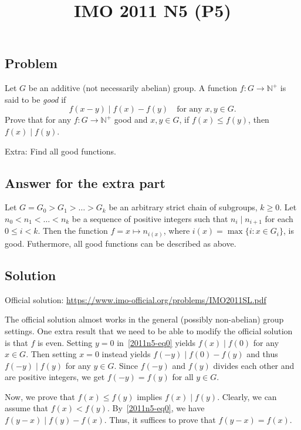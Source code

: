 \documentclass{article}
\title{IMO 2011 N5 (P5)}
\author{}
\date{}
\newcommand{\N}{\mathbb{N}}
\begin{document}
\maketitle



\subsection*{Problem}

Let $G$ be an additive (not necessarily abelian) group.
A function $f : G \to \N^+$ is said to be \emph{good} if
\[ f(x - y) \mid f(x) - f(y) \quad \text{for any } x, y \in G. \tag{*}\label{2011n5-eq0} \]
Prove that for any $f : G \to \N^+$ good and $x, y \in G$, if $f(x) \leq f(y)$, then $f(x) \mid f(y)$.

Extra: Find all good functions.



\subsection*{Answer for the extra part}

Let $G = G_0 > G_1 > \ldots > G_k$ be an arbitrary strict chain of subgroups, $k \geq 0$.
Let $n_0 < n_1 < \ldots < n_k$ be a sequence of positive integers such that $n_i \mid n_{i + 1}$ for each $0 \leq i < k$.
Then the function $f = x \mapsto n_{i(x)}$, where $i(x) = \max\{i : x \in G_i\}$, is good.
Futhermore, all good functions can be described as above.



\subsection*{Solution}

Official solution: \url{https://www.imo-official.org/problems/IMO2011SL.pdf}

The official solution almost works in the general (possibly non-abelian) group settings.
One extra result that we need to be able to modify the official solution is that $f$ is even.
Setting $y = 0$ in~\eqref{2011n5-eq0} yields $f(x) \mid f(0)$ for any $x \in G$.
Then setting $x = 0$ instead yields $f(-y) \mid f(0) - f(y)$ and thus $f(-y) \mid f(y)$ for any $y \in G$.
Since $f(-y)$ and $f(y)$ divides each other and are positive integers, we get $f(-y) = f(y)$ for all $y \in G$.

Now, we prove that $f(x) \leq f(y)$ implies $f(x) \mid f(y)$.
Clearly, we can assume that $f(x) < f(y)$.
By~\eqref{2011n5-eq0}, we have $f(y - x) \mid f(y) - f(x)$.
Thus, it suffices to prove that $f(y - x) = f(x)$.
\end{document}
